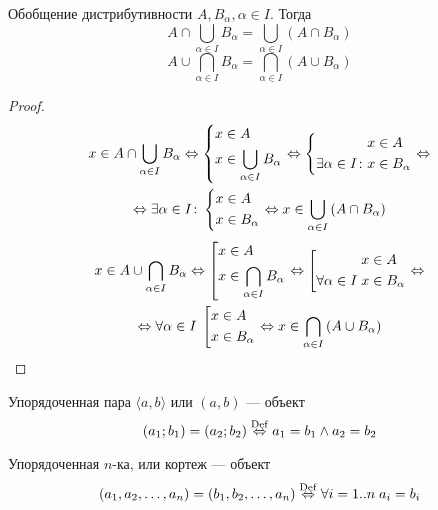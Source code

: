 \begin{theorem}{Обобщение дистрибутивности}
$ A, B_\alpha, \alpha \in I $.
Тогда 
$$ A \cap \bigcup_{\alpha \in I} B_\alpha = \bigcup_{\alpha \in I} (A \cap B_\alpha) $$
$$ A \cup \bigcap_{\alpha \in I} B_\alpha = \bigcap_{\alpha \in I} (A \cup B_\alpha) $$
\end{theorem}
\begin{proof}
\begin{multline*}
x \in A \cap \bigcup_{\alpha \in I} B_{\alpha} \Leftrightarrow \left\{\begin{aligned}x &\in A \\ x &\in \bigcup_{\alpha \in I} B_{\alpha}\end{aligned}\right. \Leftrightarrow 
\left\{\begin{aligned} x &\in A \\ \exists \alpha \in I\colon x &\in B_\alpha \end{aligned}\right. \Leftrightarrow \\ \Leftrightarrow
\exists \alpha \in I\colon \left\{\begin{aligned} x &\in A \\ x &\in B_\alpha \end{aligned}\right.  
\Leftrightarrow x \in \bigcup_{\alpha \in I} \left(A \cap B_\alpha\right) 
\end{multline*}
\begin{multline*}
x \in A \cup \bigcap_{\alpha \in I} B_{\alpha} \Leftrightarrow \left[\begin{aligned}x &\in A \\ x &\in \bigcap_{\alpha \in I} B_{\alpha}\end{aligned}\right. \Leftrightarrow 
\left[\begin{aligned} x &\in A \\ \forall \alpha \in I\; x &\in B_\alpha \end{aligned}\right. \Leftrightarrow \\ \Leftrightarrow
\forall \alpha \in I\; \left[\begin{aligned} x &\in A \\ x &\in B_\alpha \end{aligned}\right.  
\Leftrightarrow x \in \bigcap_{\alpha \in I} \left(A \cup B_\alpha\right) 
\end{multline*}
\end{proof}

\begin{Def}
Упорядоченная пара $\langle a, b \rangle$ или $(a, b)$ --- объект
$$ (a_1; b_1) = (a_2; b_2) \stackrel{\mathrm{Def}}{\Leftrightarrow} a_1 = b_1 \land a_2 = b_2 $$
\end{Def}
\begin{Def}
Упорядоченная $n$-ка, или кортеж --- объект
$$ (a_1, a_2, \ldots, a_n) = (b_1, b_2, \ldots, a_n) \stackrel{\mathrm{Def}}{\Leftrightarrow} \forall i=1..n\; a_i = b_i $$
\end{Def}

